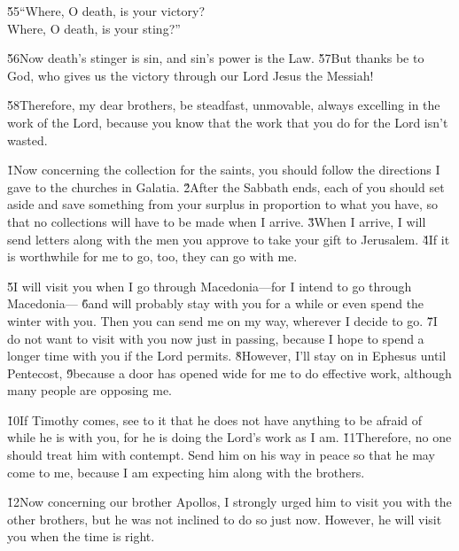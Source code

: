 \begin{poetry}
\poeml \v{55}``Where, O death, is your victory? \\
\poemll    Where, O death, is your sting?''
\end{poetry}

\v{56}Now death's stinger is sin, and sin's power is the Law. \v{57}But thanks be to God, who gives us the victory through our Lord Jesus the Messiah!

\v{58}Therefore, my dear brothers, be steadfast, unmovable, always excelling in the work of the Lord, because you know that the work that you do for the Lord isn't wasted.

\v{1}Now concerning the collection for the saints, you should follow the directions I gave to the churches in Galatia. \v{2}After the Sabbath ends, each of you should set aside and save something from your surplus in proportion to what you have, so that no collections will have to be made when I arrive. \v{3}When I arrive, I will send letters along with the men you approve to take your gift to Jerusalem. \v{4}If it is worthwhile for me to go, too, they can go with me.

\v{5}I will visit you when I go through Macedonia---for I intend to go through Macedonia--- \v{6}and will probably stay with you for a while or even spend the winter with you. Then you can send me on my way, wherever I decide to go. \v{7}I do not want to visit with you now just in passing, because I hope to spend a longer time with you if the Lord permits. \v{8}However, I'll stay on in Ephesus until Pentecost, \v{9}because a door has opened wide for me to do effective work, although many people are opposing me.

\v{10}If Timothy comes, see to it that he does not have anything to be afraid of while he is with you, for he is doing the Lord's work as I am. \v{11}Therefore, no one should treat him with contempt. Send him on his way in peace so that he may come to me, because I am expecting him along with the brothers.

\v{12}Now concerning our brother Apollos, I strongly urged him to visit you with the other brothers, but he was not inclined to do so just now. However, he will visit you when the time is right.


